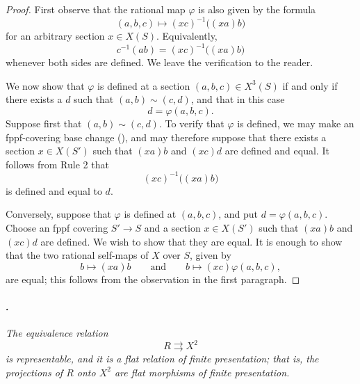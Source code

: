 \begin{proof}
First observe that the rational map \(\varphi\) is also given by
the formula
\[
  (a,b,c)\longmapsto(xc)^{-1}\bigl((xa)b\bigr)
\]
for an arbitrary section \(x\in X(S)\). Equivalently,
\[
  c^{-1}(ab)=(xc)^{-1}\bigl((xa)b\bigr)
\]
whenever both sides are defined. We leave the verification to the
reader.

We now show that \(\varphi\) is defined at a section
\((a,b,c)\in X^3(S)\) if and only if there exists a \(d\) such
that \((a,b)\sim(c,d)\), and that in this case
\[
  d=\varphi(a,b,c).
\]
Suppose first that \((a,b)\sim(c,d)\). To verify that
\(\varphi\) is defined, we may make an fppf-covering base change
(), and may therefore suppose that there exists a
section \(x\in X(S')\) such that \((xa)b\) and \((xc)d\) are
defined and equal. It follows from Rule 2 that
\[
  (xc)^{-1}\bigl((xa)b\bigr)
\]
is defined and equal to \(d\).

Conversely, suppose that \(\varphi\) is defined at
\((a,b,c)\), and put \(d=\varphi(a,b,c)\). Choose an
fppf covering \(S'\to S\) and a section \(x\in X(S')\) such that
\((xa)b\) and \((xc)d\) are defined. We wish to show that they
are equal. It is enough to show that the two rational self-maps of
\(X\) over \(S\), given by
\[
  b\longmapsto(xa)b
  \qquad\text{and}\qquad
  b\longmapsto(xc)\varphi(a,b,c),
\]
are equal; this follows from the observation in the first
paragraph.
\end{proof}

\paragraph{.}
\textit{The equivalence relation
\[
  R\rightrightarrows X^2
\]
is representable, and it is a flat relation of finite
presentation; that is, the projections of \(R\) onto \(X^2\) are
flat morphisms of finite presentation.}


